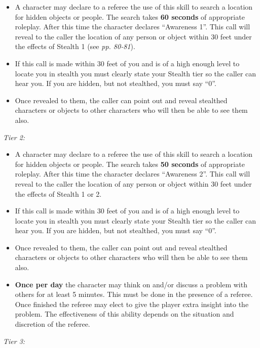 \begin{itemize}
\item A character may declare to a referee the use of this skill to search a location for hidden objects or people. The search takes \textbf{60 seconds} of appropriate roleplay. After this time the character declares ``Awareness 1''. This call will reveal to the caller the location of any person or object within 30 feet under the effects of Stealth 1 (see \textit{pp. 80-81}).

\item If this call is made within 30 feet of you and is of a high enough level to locate you in stealth you must clearly state your Stealth tier so the caller can hear you. If you are hidden, but not stealthed, you must say ``0''.

\item Once revealed to them, the caller can point out and reveal stealthed characters or objects to other characters who will then be able to see them also.

\end{itemize}
\textit{Tier 2:}

\begin{itemize}
\item A character may declare to a referee the use of this skill to search a location for hidden objects or people. The search takes \textbf{50 seconds} of appropriate roleplay. After this time the character declares ``Awareness 2''. This call will reveal to the caller the location of any person or object within 30 feet under the effects of Stealth 1 or 2.

\item If this call is made within 30 feet of you and is of a high enough level to locate you in stealth you must clearly state your Stealth tier so the caller can hear you. If you are hidden, but not stealthed, you must say ``0''.

\item Once revealed to them, the caller can point out and reveal stealthed characters or objects to other characters who will then be able to see them also.

\item \textbf{Once per day} the character may think on and/or discuss a problem with others for at least 5 minutes. This must be done in the presence of a referee. Once finished the referee may elect to give the player extra insight into the problem. The effectiveness of this ability depends on the situation and discretion of the referee.

\end{itemize}
\textit{Tier 3:}

